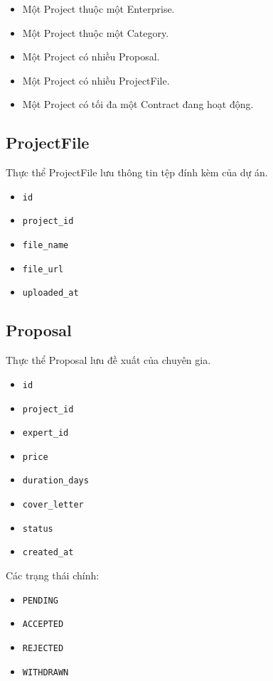 \begin{itemize}
    \item Một Project thuộc một Enterprise.
    \item Một Project thuộc một Category.
    \item Một Project có nhiều Proposal.
    \item Một Project có nhiều ProjectFile.
    \item Một Project có tối đa một Contract đang hoạt động.
\end{itemize}

\subsection{ProjectFile}

Thực thể ProjectFile lưu thông tin tệp đính kèm của dự án.

\begin{itemize}
    \item \texttt{id}
    \item \texttt{project\_id}
    \item \texttt{file\_name}
    \item \texttt{file\_url}
    \item \texttt{uploaded\_at}
\end{itemize}

\subsection{Proposal}

Thực thể Proposal lưu đề xuất của chuyên gia.

\begin{itemize}
    \item \texttt{id}
    \item \texttt{project\_id}
    \item \texttt{expert\_id}
    \item \texttt{price}
    \item \texttt{duration\_days}
    \item \texttt{cover\_letter}
    \item \texttt{status}
    \item \texttt{created\_at}
\end{itemize}

Các trạng thái chính:

\begin{itemize}
    \item \texttt{PENDING}
    \item \texttt{ACCEPTED}
    \item \texttt{REJECTED}
    \item \texttt{WITHDRAWN}
\end{itemize}

